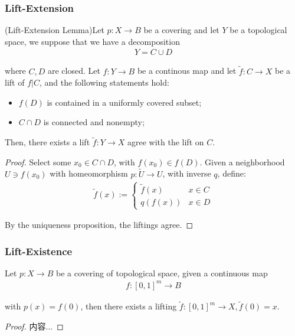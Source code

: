 \documentclass[Total.tex]{subfiles}
\begin{document}
			\subsubsection{Lift-Extension}
				\begin{lemma}
					(Lift-Extension Lemma)Let $p:X\rightarrow B$ be a covering and let $Y$ be a topological space, we suppose that we have a decomposition
					\begin{gather*}
						Y=C\cup D
					\end{gather*}
					
					where $C,D$ are closed. Let $f:Y\rightarrow B$ be a continous map and let $\tilde{f}:C\rightarrow X$ be a lift of $f|C$, and the following statements hold:
					\begin{itemize}
						\item $f(D)$ is contained in a uniformly covered subset;
						\item $C\cap D$ is connected and nonempty;
					\end{itemize}
					
					Then, there exists a lift $\tilde{f}:Y\rightarrow X$ agree with the lift on $C$.
				\end{lemma}
				\begin{proof}
					Select some $x_0\in C\cap D$, with $f(x_0)\in f(D)$. Given a neighborhood $U\ni f(x_0)$ with homeomorphism $p:\tilde{U}\rightarrow U$, with inverse $q$, define:
					\begin{gather*}
						\tilde{f}(x):=\begin{cases}
							\tilde{f}(x)&x\in C\\
							q(f(x))&x\in D
						\end{cases}
					\end{gather*}
					
					By the uniqueness proposition, the liftings agree.
				\end{proof}
			\subsubsection{Lift-Existence}
				\begin{lemma}
					Let $p:X\rightarrow B$ be a covering of topological space, given a continuous map
					\begin{gather*}
						f:[0,1]^m\rightarrow B
					\end{gather*}
					
					with $p(x)=f(0)$, then there exists a lifting $\tilde{f}:[0,1]^m\rightarrow X,\tilde{f}(0)=x$.
				\end{lemma}
				\begin{proof}
					内容...
				\end{proof}
\end{document}
